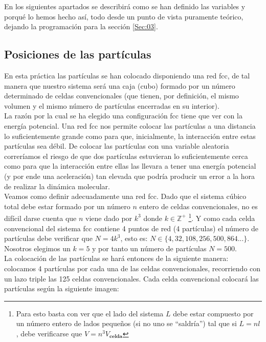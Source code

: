 \documentclass[11pt]{article}
\begin{document}
En los siguientes apartados se describirá como se han definido las variables y porqué lo hemos hecho así, todo desde un punto de vista puramente teórico, dejando la programación para la sección \ref{Sec:03}.


\subsection{Posiciones de las partículas}

En esta práctica las partículas se han colocado disponiendo una red fcc, de tal manera que nuestro sistema será una caja (cubo) formado por un número determinado de celdas convencionales (que tienen, por definición, el mismo volumen y el mismo número de partículas encerradas en su interior). \\

La razón por la cual se ha elegido una configuración fcc tiene que ver con la energía potencial. Una red fcc nos permite colocar las partículas a una distancia lo suficientemente grande como para que, inicialmente, la interacción entre estas partículas sea débil. De colocar las partículas con una variable aleatoria correríamos el riesgo de que dos partículas estuvieran lo suficientemente cerca como para que la interacción entre ellas las llevara a tener una energía potencial (y por ende una aceleración) tan elevada que podría producir un error a la hora de realizar la dinámica molecular. \\

Veamos como definir adecuadamente una red fcc. Dado que el sistema cúbico total debe estar formado por un número $n$ entero de celdas convencionales, no es difícil darse cuenta que $n$ viene dado por $k^3$ donde $k\in\mathbb{Z^+}$ \footnote{Para esto basta con ver que el lado del sistema $L$ debe estar compuesto por un número entero de lados pequeños (si no uno se ``saldría'') tal que si $L=nl$, debe verificarse que $V=n^3V_{\textbf{celda}}$}. Y como cada celda convencional del sistema fcc contiene 4 puntos de red (4 partículas) el número de partículas debe verificar que $N=4k^3$, esto es: $N\in\{4,32,108,256,500,864...\}$. Nosotros elegimos un $k=5$ y por tanto un número de partículas $N=500$. \\

La colocación de las partículas se hará entonces de la siguiente manera: colocamos 4 partículas por cada una de las celdas convencionales, recorriendo con un lazo triple las 125 celdas convencionales. Cada celda convencional colocará las partículas según la siguiente imagen:
\end{document}
